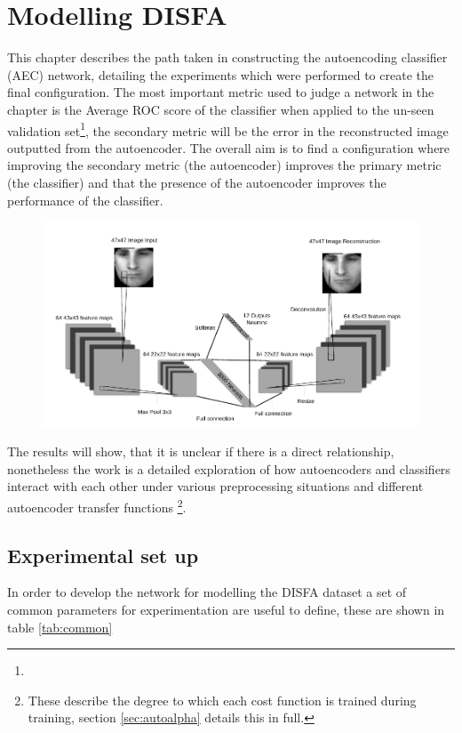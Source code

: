 \chapter{Modelling DISFA} \label{sec:model}
  This chapter describes the path taken in constructing the autoencoding classifier (AEC) network, detailing
  the experiments which were performed to create the final configuration.
  The most important metric used to judge a network in the chapter is the Average ROC score of the classifier
  when applied to the un-seen validation set\footnote{}, the secondary metric will be the error
  in the reconstructed image outputted from the autoencoder. The overall aim is to
  find a configuration where improving the secondary metric (the autoencoder) improves
  the primary metric (the classifier) and that the presence of the autoencoder improves
  the performance of the classifier.

  \begin{figure}[h!]
   \centering
   \includegraphics[width=\textwidth]{illustrations/aec_network.pdf}
  \end{figure}

  The results will show, that it is unclear if there is a direct relationship, nonetheless
  the work is a detailed exploration of how autoencoders and classifiers interact with each other
  under various preprocessing situations and different autoencoder transfer functions \footnote{These describe the degree to which
  each cost function is trained during training, section \ref{sec:autoalpha} details this in full.}.

  \section{Experimental set up}
    In order to develop the network for modelling the DISFA dataset a set of common
    parameters for experimentation are useful to define, these are shown in table \ref{tab:common}

